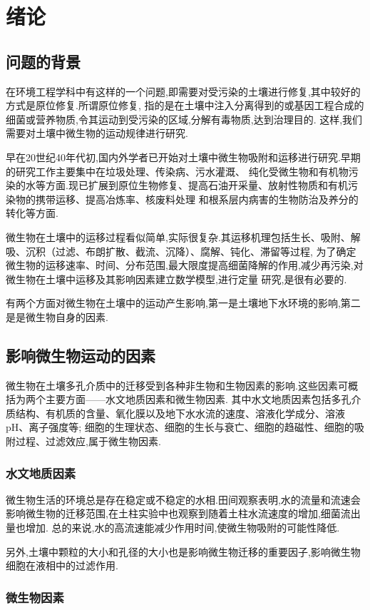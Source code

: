 \chapter{绪论}
\section{问题的背景}
在环境工程学科中有这样的一个问题,即需要对受污染的土壤进行修复,其中较好的方式是原位修复.所谓原位修复,
指的是在土壤中注入分离得到的或基因工程合成的细菌或营养物质,令其运动到受污染的区域,分解有毒物质,达到治理目的.
这样,我们需要对土壤中微生物的运动规律进行研究.\par
早在20世纪40年代初,国内外学者已开始对土壤中微生物吸附和运移进行研究.早期的研究工作主要集中在垃圾处理、传染病、污水灌溉、
纯化受微生物和有机物污染的水等方面.现已扩展到原位生物修复、提高石油开采量、放射性物质和有机污染物的携带运移、提高冶炼率、核废料处理
和根系层内病害的生物防治及养分的转化等方面.\par
微生物在土壤中的运移过程看似简单,实际很复杂.其运移机理包括生长、吸附、解吸、沉积（过滤、布朗扩散、截流、沉降）、腐解、钝化、滞留等过程,
为了确定微生物的运移速率、时间、分布范围,最大限度提高细菌降解的作用,减少再污染,对微生物在土壤中运移及其影响因素建立数学模型,进行定量
研究,是很有必要的.\par
有两个方面对微生物在土壤中的运动产生影响,第一是土壤地下水环境的影响,第二是是微生物自身的因素.
\section{影响微生物运动的因素}
微生物在土壤多孔介质中的迁移受到各种非生物和生物因素的影响.这些因素可概括为两个主要方面——水文地质因素和微生物因素.
其中水文地质因素包括多孔介质结构、有机质的含量、氧化膜以及地下水水流的速度、溶液化学成分、溶液pH、离子强度等;
细胞的生理状态、细胞的生长与衰亡、细胞的趋磁性、细胞的吸附过程、过滤效应,属于微生物因素.
\subsection{水文地质因素}
微生物生活的环境总是存在稳定或不稳定的水相.田间观察表明,水的流量和流速会影响微生物的迁移范围,在土柱实验中也观察到随着土柱水流速度的增加,细菌流出量也增加.
总的来说,水的高流速能减少作用时间,使微生物吸附的可能性降低.\par
另外,土壤中颗粒的大小和孔径的大小也是影响微生物迁移的重要因子,影响微生物细胞在液相中的过滤作用.
\subsection{微生物因素}
